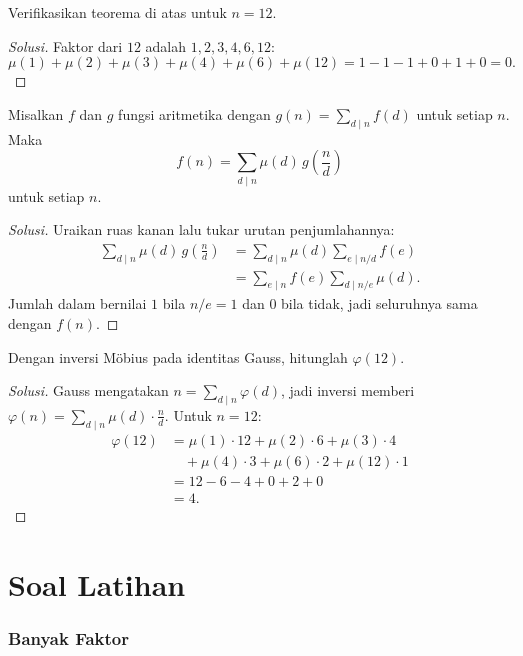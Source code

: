 \documentclass[12pt]{scrartcl}
\begin{document}
\begin{example}
Verifikasikan teorema di atas untuk $n = 12$.
\end{example}
\begin{proof}[Solusi]
Faktor dari $12$ adalah $1, 2, 3, 4, 6, 12$:
\[ \mu(1) + \mu(2) + \mu(3) + \mu(4) + \mu(6) + \mu(12)
= 1 - 1 - 1 + 0 + 1 + 0 = 0. \]
\end{proof}

\begin{theorem}
Misalkan $f$ dan $g$ fungsi aritmetika dengan $g(n) = \sum_{d \mid n} f(d)$
untuk setiap $n$. Maka
\[ f(n) = \sum_{d \mid n} \mu(d)\, g\left(\frac{n}{d}\right) \]
untuk setiap $n$.
\end{theorem}

\begin{proof}[Solusi]
Uraikan ruas kanan lalu tukar urutan penjumlahannya:
\begin{align*}
\sum_{d \mid n} \mu(d)\, g\left(\frac{n}{d}\right)
&= \sum_{d \mid n} \mu(d) \sum_{e \mid n/d} f(e) \\
&= \sum_{e \mid n} f(e) \sum_{d \mid n/e} \mu(d).
\end{align*}
Jumlah dalam bernilai $1$ bila $n/e = 1$ dan $0$ bila tidak,
jadi seluruhnya sama dengan $f(n)$.
\end{proof}

\begin{example}
Dengan inversi M\"obius pada identitas Gauss, hitunglah $\varphi(12)$.
\end{example}
\begin{proof}[Solusi]
Gauss mengatakan $n = \sum_{d \mid n} \varphi(d)$,
jadi inversi memberi $\varphi(n) = \sum_{d \mid n} \mu(d) \cdot \frac{n}{d}$.
Untuk $n = 12$:
\begin{align*}
\varphi(12) &= \mu(1) \cdot 12 + \mu(2) \cdot 6 + \mu(3) \cdot 4 \\
&\quad + \mu(4) \cdot 3 + \mu(6) \cdot 2 + \mu(12) \cdot 1 \\
&= 12 - 6 - 4 + 0 + 2 + 0 \\
&= 4.
\end{align*}
\end{proof}

\part*{Soal Latihan}

\section{Banyak Faktor}
\end{document}
